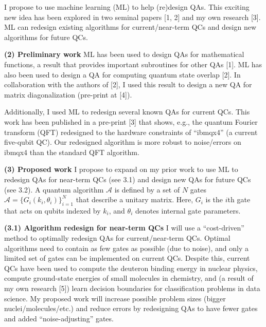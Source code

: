 \documentclass[10pt]{article}
\begin{document}
I propose to use machine learning (ML) to help (re)design QAs. This exciting new idea has been explored in two seminal papers [1, 2] and my own research [3]. ML can redesign existing algorithms for current/near-term QCs and design new algorithms for future QCs.


\textbf{(2) Preliminary work} \tab ML has been used to design QAs for mathematical functions, a result that provides important subroutines for other QAs [1]. ML has also been used to design a QA for computing quantum state overlap [2]. In collaboration with the authors of [2], I used this result to design a new QA for matrix diagonalization (pre-print at [4]).

Additionally, I used ML to redesign several known QAs for current QCs. This work has been published in a pre-print [3] that shows, e.g., the quantum Fourier transform (QFT) redesigned to the hardware constraints of ``ibmqx4'' (a current five-qubit QC). Our redesigned algorithm is more robust to noise/errors on ibmqx4 than the standard QFT algorithm.


\textbf{(3) Proposed work} \tab I propose to expand on my prior work to use ML to redesign QAs for near-term QCs (see 3.1) and design new QAs for future QCs (see 3.2). A quantum algorithm $\mathcal{A}$ is defined by a set of $N$ gates $\mathcal{A} = \{ G_i(k_i, \theta_i)\}_{i = 1}^{N}$ that describe a unitary matrix. Here, $G_i$ is the $i$th gate that acts on qubits indexed by $k_i$, and $\theta_i$ denotes internal gate parameters.

\textbf{(3.1) Algorithm redesign for near-term QCs} \tab I will use a ``cost-driven'' method to optimally redesign QAs for current/near-term QCs. Optimal algorithms need to contain as few gates as possible (due to noise), and only a limited set of gates can be implemented on current QCs. Despite this, current QCs have been used to compute the deuteron binding energy in nuclear physics, compute ground-state energies of small molecules in chemistry, and (a result of my own research [5]) learn decision boundaries for classification problems in data science. My proposed work will increase possible problem sizes (bigger nuclei/molecules/etc.) and reduce errors by redesigning QAs to have fewer gates and added ``noise-adjusting'' gates.
\end{document}
